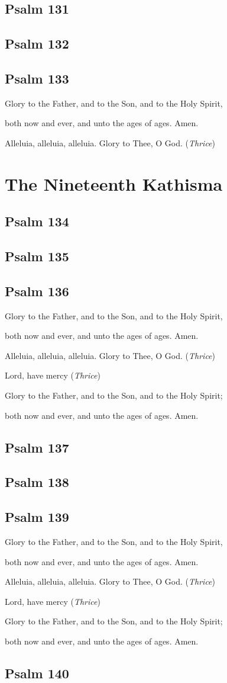 \documentclass[12pt,openany]{book}
\newcommand{\kathismabreak}{
  \medskip
  \begin{center}
  \begin{footnotesize}
  Glory to the Father, and to the Son, and to the Holy Spirit,
  
  both now and ever, and unto the ages of ages. Amen.

  Alleluia, alleluia, alleluia. Glory to Thee, O God. (\textit{Thrice})

  Lord, have mercy (\textit{Thrice})

  Glory to the Father, and to the Son, and to the Holy Spirit;
  
  both now and ever, and unto the ages of ages. Amen.
  \end{footnotesize}
  \end{center}
  \smallbreak
}
\newcommand{\kathismaend}{
  \medskip
  \begin{center}
  \begin{footnotesize}
  Glory to the Father, and to the Son, and to the Holy Spirit,
  
  both now and ever, and unto the ages of ages. Amen.

  Alleluia, alleluia, alleluia. Glory to Thee, O God. (\textit{Thrice})
  \end{footnotesize}
  \end{center}
  \smallbreak
}
\begin{document}
\section{Psalm 131}

\smallskip
\pagebreak %
\section{Psalm 132}

\smallskip
\section{Psalm 133}


\kathismaend

\chapter*{The Nineteenth Kathisma}
\smallskip
\section{Psalm 134}

\smallskip
\section{Psalm 135}

\smallskip
\section{Psalm 136}


\kathismabreak
\smallskip
\section{Psalm 137}

\smallskip
\section{Psalm 138}

\smallskip
\section{Psalm 139}


\kathismabreak
\smallskip
\section{Psalm 140}

\smallskip
\end{document}
